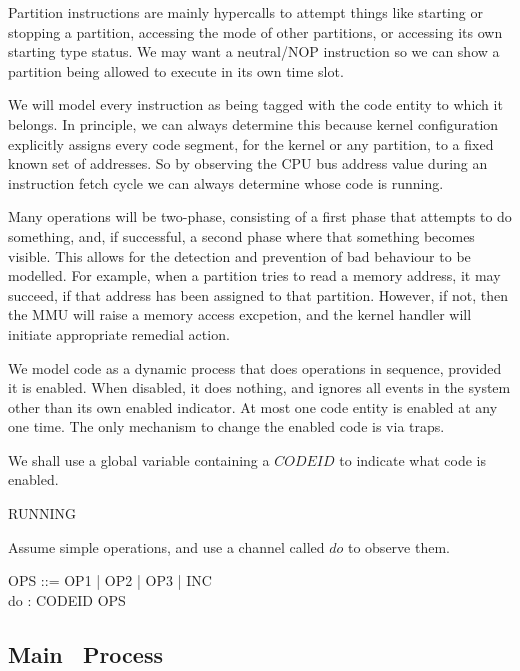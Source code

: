 Partition instructions are mainly hypercalls to attempt
things like starting or stopping a partition,
accessing the mode of other partitions,
or accessing its own starting type status.
We may want a neutral/NOP instruction so we can show a partition
being allowed to execute in its own time slot.

We will model every instruction as being tagged with the code entity to
which it belongs.
In principle, we can always determine this because kernel configuration
explicitly assigns every code segment,
for the kernel or any partition,
to a fixed known set of addresses.
So by observing the CPU bus address value during an instruction fetch cycle
we can always determine whose code is running.

Many operations will be two-phase,
consisting of a first phase that attempts to do something,
and, if successful, a second phase where that something becomes visible.
This allows for the detection and prevention of bad behaviour to be modelled.
For example, when a partition tries to read a memory address,
it may succeed, if that address has been assigned to that partition.
However, if not, then the MMU will raise a memory access excpetion,
and the kernel handler will initiate appropriate remedial action.

We model code as a dynamic process that does operations in sequence,
provided it is enabled.
When disabled, it does nothing, and ignores all events in the system
other than its own enabled indicator.
At most one code entity is enabled at any one time.
The only mechanism to change the enabled code is via
traps.

We shall use a global variable containing a $CODEID$ to indicate
what code is enabled.
\begin{circus}
RUNNING 
\end{circus}

Assume simple operations,
and use a channel called $do$ to observe them.
\begin{circus}
   OPS ::= OP1 | OP2 | OP3 | INC
\\ \circchannel do : CODEID \cross OPS
\end{circus}



\newpage
\subsection{Main \Circus\ Process}

